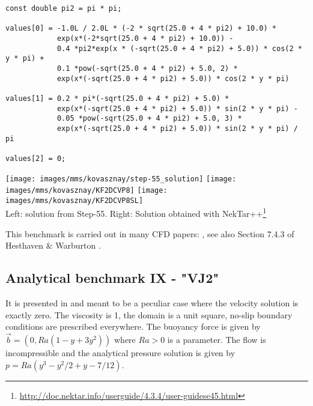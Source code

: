 \begin{lstlisting}
const double pi2 = pi * pi;

values[0] = -1.0L / 2.0L * (-2 * sqrt(25.0 + 4 * pi2) + 10.0) *
            exp(x*(-2*sqrt(25.0 + 4 * pi2) + 10.0)) -
            0.4 *pi2*exp(x * (-sqrt(25.0 + 4 * pi2) + 5.0)) * cos(2 * y * pi) +
            0.1 *pow(-sqrt(25.0 + 4 * pi2) + 5.0, 2) *
            exp(x*(-sqrt(25.0 + 4 * pi2) + 5.0)) * cos(2 * y * pi)

values[1] = 0.2 * pi*(-sqrt(25.0 + 4 * pi2) + 5.0) *
            exp(x*(-sqrt(25.0 + 4 * pi2) + 5.0)) * sin(2 * y * pi) -
            0.05 *pow(-sqrt(25.0 + 4 * pi2) + 5.0, 3) *
            exp(x*(-sqrt(25.0 + 4 * pi2) + 5.0)) * sin(2 * y * pi) / pi

values[2] = 0;
\end{lstlisting}

\begin{center}
\texttt{[image: images/mms/kovasznay/step-55\_solution]}
\texttt{[image: images/mms/kovasznay/KF2DCVP8]}
\texttt{[image: images/mms/kovasznay/KF2DCVP8SL]}\\
{\captionfont 
Left: solution from Step-55. Right:
Solution obtained with 
NekTar++\footnote{\url{http://doc.nektar.info/userguide/4.3.4/user-guidese45.html}}}
\end{center}


This benchmark is carried out in many CFD papers: \cite{coks04b,bodi11,ngpe12}, see also Section 7.4.3
of Hesthaven \& Warburton \cite{hewa08}.


\bscthesis {}

\subsection{Analytical benchmark IX \label{mms9} - "VJ2"}

It is presented in \cite{jolm17} and meant to be a peculiar case where the velocity solution 
is exactly zero. The viscosity is 1, the domain is a unit square, no-slip boundary conditions 
are prescribed everywhere. The buoyancy force is given by $\vec{b}=(0,Ra(1-y+3y^2))$ where 
$Ra>0$ is a parameter. The flow is incompressible and the analytical pressure solution 
is given by $p=Ra(y^3-y^2/2+y-7/12)$.

